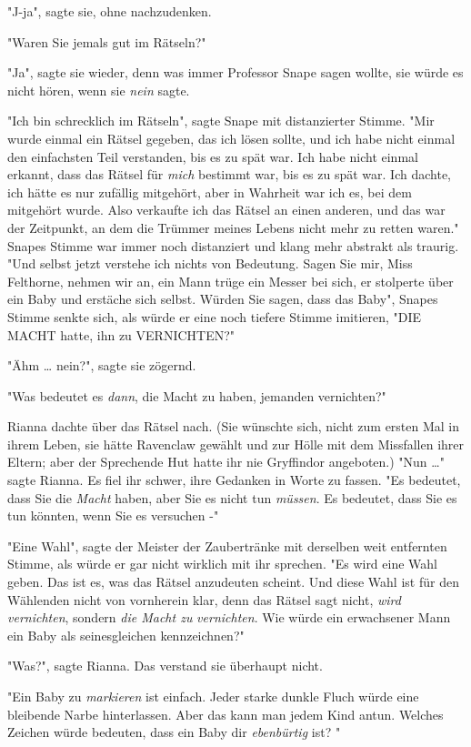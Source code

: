 {"J-ja", sagte sie, ohne nachzudenken.

"Waren Sie jemals gut im Rätseln?"

"Ja", sagte sie wieder, denn was immer Professor Snape sagen wollte, sie würde es nicht hören, wenn sie \emph{nein} sagte.

"Ich bin schrecklich im Rätseln", sagte Snape mit distanzierter Stimme. "Mir wurde einmal ein Rätsel gegeben, das ich lösen sollte, und ich habe nicht einmal den einfachsten Teil verstanden, bis es zu spät war. Ich habe nicht einmal erkannt, dass das Rätsel für \emph{mich} bestimmt war, bis es zu spät war. Ich dachte, ich hätte es nur zufällig mitgehört, aber in Wahrheit war ich es, bei dem mitgehört wurde. Also verkaufte ich das Rätsel an einen anderen, und das war der Zeitpunkt, an dem die Trümmer meines Lebens nicht mehr zu retten waren." Snapes Stimme war immer noch distanziert und klang mehr abstrakt als traurig. "Und selbst jetzt verstehe ich nichts von Bedeutung. Sagen Sie mir, Miss Felthorne, nehmen wir an, ein Mann trüge ein Messer bei sich, er stolperte über ein Baby und erstäche sich selbst. Würden Sie sagen, dass das Baby", Snapes Stimme senkte sich, als würde er eine noch tiefere Stimme imitieren, "DIE MACHT hatte, ihn zu VERNICHTEN?"

"Ähm … nein?", sagte sie zögernd.

"Was bedeutet es \emph{dann}, die Macht zu haben, jemanden vernichten?"

Rianna dachte über das Rätsel nach. (Sie wünschte sich, nicht zum ersten Mal in ihrem Leben, sie hätte Ravenclaw gewählt und zur Hölle mit dem Missfallen ihrer Eltern; aber der Sprechende Hut hatte ihr nie Gryffindor angeboten.) "Nun …" sagte Rianna. Es fiel ihr schwer, ihre Gedanken in Worte zu fassen. "Es bedeutet, dass Sie die \emph{Macht} haben, aber Sie es nicht tun \emph{müssen}. Es bedeutet, dass Sie es tun könnten, wenn Sie es versuchen -"

"Eine Wahl", sagte der Meister der Zaubertränke mit derselben weit entfernten Stimme, als würde er gar nicht wirklich mit ihr sprechen. "Es wird eine Wahl geben. Das ist es, was das Rätsel anzudeuten scheint. Und diese Wahl ist für den Wählenden nicht von vornherein klar, denn das Rätsel sagt nicht, \emph{wird} \emph{vernichten}, sondern \emph{die Macht zu} \emph{vernichten}. Wie würde ein erwachsener Mann ein Baby als seinesgleichen kennzeichnen?"

"Was?", sagte Rianna. Das verstand sie überhaupt nicht.

"Ein Baby zu \emph{markieren} ist einfach. Jeder starke dunkle Fluch würde eine bleibende Narbe hinterlassen. Aber das kann man jedem Kind antun. Welches Zeichen würde bedeuten, dass ein Baby dir \emph{ebenbürtig} ist? "

}
